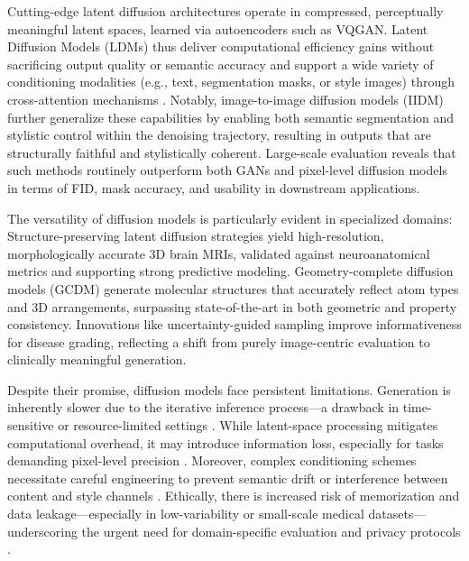 \documentclass[sigconf]{acmart}
\begin{document}
Cutting-edge latent diffusion architectures operate in compressed, perceptually meaningful latent spaces, learned via autoencoders such as VQGAN. Latent Diffusion Models (LDMs) thus deliver computational efficiency gains without sacrificing output quality or semantic accuracy and support a wide variety of conditioning modalities (e.g., text, segmentation masks, or style images) through cross-attention mechanisms \cite{ref73,ref76,ref90,ref102}. Notably, image-to-image diffusion models (IIDM) further generalize these capabilities by enabling both semantic segmentation and stylistic control within the denoising trajectory, resulting in outputs that are structurally faithful and stylistically coherent. Large-scale evaluation reveals that such methods routinely outperform both GANs and pixel-level diffusion models in terms of FID, mask accuracy, and usability in downstream applications.

The versatility of diffusion models is particularly evident in specialized domains:
Structure-preserving latent diffusion strategies yield high-resolution, morphologically accurate 3D brain MRIs, validated against neuroanatomical metrics and supporting strong predictive modeling.
Geometry-complete diffusion models (GCDM) generate molecular structures that accurately reflect atom types and 3D arrangements, surpassing state-of-the-art in both geometric and property consistency.
Innovations like uncertainty-guided sampling improve informativeness for disease grading, reflecting a shift from purely image-centric evaluation to clinically meaningful generation.

Despite their promise, diffusion models face persistent limitations. Generation is inherently slower due to the iterative inference process—a drawback in time-sensitive or resource-limited settings \cite{ref73,ref76,ref90}. While latent-space processing mitigates computational overhead, it may introduce information loss, especially for tasks demanding pixel-level precision \cite{ref73,ref76}. Moreover, complex conditioning schemes necessitate careful engineering to prevent semantic drift or interference between content and style channels \cite{ref102}. Ethically, there is increased risk of memorization and data leakage—especially in low-variability or small-scale medical datasets—underscoring the urgent need for domain-specific evaluation and privacy protocols \cite{ref91,ref100}.
\end{document}
